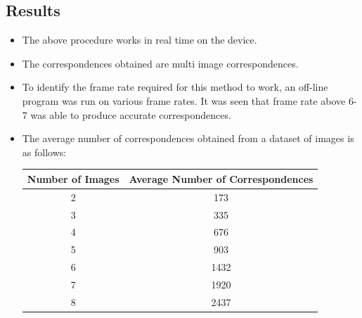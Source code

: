 \documentclass{article}
\begin{document}
		\subsection{Results}
			\begin{itemize}
				\item The above procedure works in real time on the device.
				\item The correspondences obtained are multi image correspondences. 
				\item To identify the frame rate required for this method to work, an off-line program was run on various frame rates. It was seen that frame rate above 6-7 was able to produce accurate correspondences.
				\item The average number of correspondences obtained from a dataset of images is as follows: \\ 
					\begin{center}
 					\begin{tabular}{|c | c|}
 						\hline
 						Number of Images & Average Number of Correspondences \\ \hline
 						2 & 173 \\ \hline
 						3 & 335 \\ \hline
 						4 & 676 \\ \hline
 						5 & 903 \\ \hline
 						6 & 1432 \\ \hline
 						7 & 1920 \\ \hline
 						8 & 2437 \\ \hline


\end{tabular}
\end{center}
\end{itemize}
\end{document}
